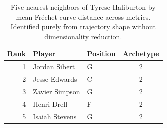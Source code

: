\begin{table}[htbp]
  \centering\small
  \begin{tabular}{rllc}
    \toprule
    Rank & Player & Position & Archetype \\
    \midrule
    1 & Jordan Sibert & G & 2 \\
    2 & Jesse Edwards & C & 2 \\
    3 & Zavier Simpson & G & 2 \\
    4 & Henri Drell & F & 2 \\
    5 & Isaiah Stevens & G & 2 \\
    \bottomrule
  \end{tabular}
  \caption{Five nearest neighbors of Tyrese Haliburton by mean Fr\'{e}chet curve distance across metrics. Identified purely from trajectory shape without dimensionality reduction.}
  \label{tab:Tyrese_Haliburton_frechet_curve_neighbors}
\end{table}

